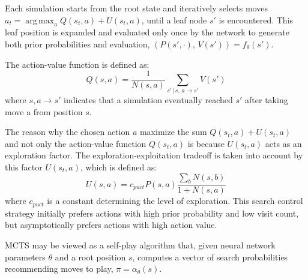 \documentclass{article}
\DeclareMathOperator*{\argmax}{arg\,max}
\begin{document}
Each simulation starts from the root state and iteratively selects moves $a_t  = \argmax_a{Q(s_t,a) + U(s_t,a)}$, until a leaf node $s'$ is encountered. This leaf position is expanded and evaluated only once by the network to generate both prior probabilities and evaluation, $(P(s', \cdot), \, V(s')) = f_\theta(s')$.

The action-value function is defined as:
\begin{equation}
	Q(s, a) = \frac{1}{N(s,a)} \sum_{s'\, | \, s,\, a \rightarrow s'}{V(s')}
\end{equation}
where $s, a \rightarrow s'$ indicates that a simulation eventually reached $s'$ after taking move a from position $s$.

The reason why the chosen action $a$ maximize the sum $Q(s_t,a) + U(s_t,a)$ and not only the action-value function $Q(s_t, a)$ is because $U(s_t,a)$ acts as an exploration factor. The exploration-exploitation tradeoff is taken into account by this factor $U(s_t,a)$, which is defined as:
\begin{equation}
	U(s, a) = c_{puct}P(s, a)\frac{\sum_b N(s,b)}{1+N(s,a)}
\end{equation}
where $c_{puct}$ is a constant determining the level of exploration. This search control strategy initially prefers actions with high prior probability and low visit count, but asymptotically prefers actions with high action value.

MCTS may be viewed as a self-play algorithm that, given neural network parameters $\theta$ and a root position $s$, computes a vector of search probabilities recommending moves to play, $\pi = \alpha_\theta(s)$.
\end{document}

